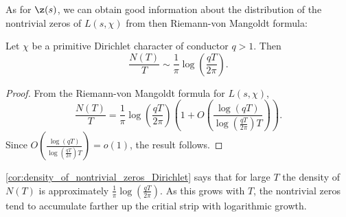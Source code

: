       As for $\z(s)$, we can obtain good information about the distribution of the nontrivial zeros of $L(s,\chi)$ from then Riemann-von Mangoldt formula:

      \begin{corollary}\label{cor:density_of_nontrivial_zeros_Dirichlet}
        Let $\chi$ be a primitive Dirichlet character of conductor $q > 1$. Then
        \[
          \frac{N(T)}{T} \sim \frac{1}{\pi}\log\left(\frac{qT}{2\pi}\right).
        \]
      \end{corollary}
      \begin{proof}
        From the Riemann-von Mangoldt formula for $L(s,\chi)$,
        \[
          \frac{N(T)}{T} = \frac{1}{\pi}\log\left(\frac{qT}{2\pi}\right)\left(1+O\left(\frac{\log(qT)}{\log\left(\frac{qT}{2\pi}\right)T}\right)\right).
        \]
        Since $O\left(\frac{\log(qT)}{\log\left(\frac{qT}{2\pi}\right)T}\right) = o(1)$, the result follows.
      \end{proof}

      \cref{cor:density_of_nontrivial_zeros_Dirichlet} says that for large $T$ the density of $N(T)$ is approximately $\frac{1}{\pi}\log\left(\frac{qT}{2\pi}\right)$. As this grows with $T$, the nontrivial zeros tend to accumulate farther up the critial strip with logarithmic growth.
